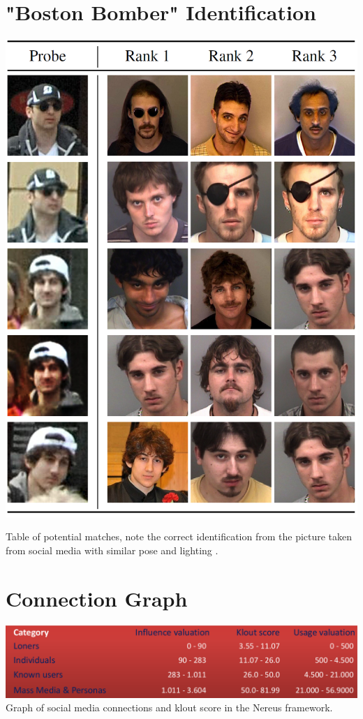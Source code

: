 \documentclass[12pt]{article}
\begin{document}
\begin{appendices}
\section{"Boston Bomber" Identification}
\label{appendix:bostonbomber}
\includegraphics[scale=0.8]{res/boston_bomber.png}

Table of potential matches, note the correct identification from the picture taken from social media with similar pose and lighting \citep{bostonbombingcasestudy}.

\section{Connection Graph}
\label{appendix:connectiongraph}
\includegraphics[width=\linewidth]{res/connection_klout.png}
Graph of social media connections and klout score in the Nereus framework\citep{behaviourdetection}.


\end{appendices}
\end{document}
